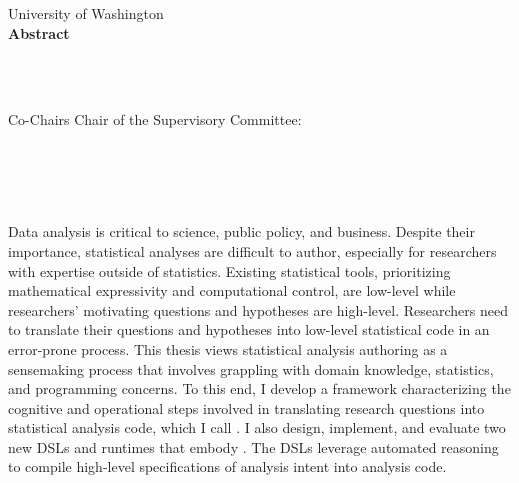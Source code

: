 
\thispagestyle{empty}
\begin{centering}
\vspace{1in}
University of Washington \\
\vspace*{1.\baselineskip}
{\bf Abstract}\\
\vspace*{1\baselineskip}

{\thesisTitle}\\ %
\vspace*{1.\baselineskip}
{\authorName} \\ %
\vspace*{1.\baselineskip}


\ifdefined\secondAdvisor
    Co-Chairs
    \else
    Chair
\fi
of the Supervisory Committee:\\ %
\advisorTitle~\advisor\\ \vspace{-.5em} \advisorDepartment \\
\ifdefined\secondAdvisor
    \secondAdvisorTitle~\secondAdvisor\\\vspace{-.5em}\secondAdvisorDepartment \\
\fi
\end{centering}
\vspace*{\baselineskip}


Data analysis is critical to science, public policy, and business. Despite their
importance, statistical analyses are difficult to author, especially for
researchers with expertise outside of statistics. Existing statistical tools,
prioritizing mathematical expressivity and computational control, are low-level
while researchers' motivating questions and hypotheses are high-level.
Researchers need to translate their questions and hypotheses into low-level
statistical code in an error-prone process. 
This thesis views statistical analysis authoring as a sensemaking process that
involves grappling with domain knowledge, statistics, and programming concerns.
To this end, I develop a framework characterizing the cognitive and operational
steps involved in translating research questions into statistical analysis code,
which I call \hypoForm. I also design, implement, and evaluate two new DSLs and
runtimes that embody \hypoForm. The DSLs leverage automated reasoning to compile
high-level specifications of analysis intent into analysis code.

